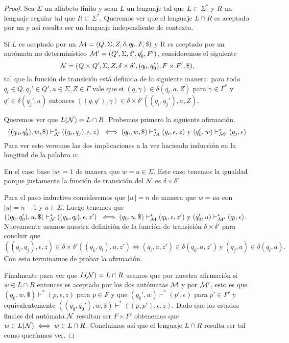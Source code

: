 \documentclass[tesis.tex]{subfiles}
\begin{document}
\begin{proof}
	Sea $\Sigma$ un alfabeto finito y sean $L$ un lenguaje \ic tal que $L \subset \Sigma^*$ y $R$ un lenguaje regular tal que $R \subset \Sigma^*$. 
	Queremos ver que el lenguaje $L \cap R$ es aceptado por un \APND y así resulta ser un lenguaje independiente de contexto.
	
	Si $L$ es aceptado por un \APND ${\cal M } = (Q, \Sigma, Z, \delta, q_0, F, \$)$ y R es aceptado por un autómata no determinístico ${\cal M' } = (Q', \Sigma, \delta', q_0', F')$, consideremos el siguiente \APND
	\[
		{\cal N } = (Q \times Q', \Sigma, Z, \delta \times \delta', (q_0,q_0'), F \times F', \$),
	\]	
	tal que la función de transición está definida de la siguiente manera:
	para todo $q_{i} \in Q, q_{j}' \in Q', a \in \Sigma, Z \in \Gamma$ vale que
	si $(q,\gamma) \in \delta(q_{i},a,Z)$ para $\gamma \in \Gamma^*$ y $q'  \in \delta(q_{j}', a)$ entonces $ ((q,q'), \gamma) \in \delta \times \delta'((q_{i},q_{j}'),a,Z)$.
	
	
	Queremos ver que $L({\cal N}) = L \cap R $.	
	Probemos primero la siguiente afirmación.
	\[
	((q_0,q_0'), w, \$) \vdash^*_{\cal N}  ((q_i,q_j), \epsilon, z) \ \iff (q_0, w, \$) \vdash^*_{\cal M}  (q_i, \epsilon, z) \ \text{y} \ (q_0', w) \vdash^*_{\cal M'} (q_j, \epsilon)  	
	\]
	Para ver esto veremos las dos implicaciones a la vez haciendo inducción en la longitud de la palabra $w$.
	
	En el caso base $|w| = 1$ de manera que $w = a \in \Sigma$.
	Este caso tenemos la igualdad porque justamente la función de transición del \APND $\cal N$ es $\delta \times \delta'$.
	
	Para el paso inductivo consideremos que $|w|=n$ de manera que $w=ua$ con $|u|=n-1$ y $a \in \Sigma$.
	Luego tenemos que $((q_0,q_0'), u, \$) \vdash^*_{\cal N}  ((q_k,q_l), \epsilon, z') \ \iff (q_0, u, \$) \vdash^*_{\cal M}  (q_k, \epsilon, z') \ \text{y} \ (q_0', u) \vdash^*_{\cal M'} (q_l, \epsilon)$.
	Nuevamente usamos nuestra definición de la función de transición $\delta \times \delta'$ para concluir que
	\[ 
	((q_i,q_j),\epsilon, z) \in \delta \times \delta'((q_k,q_l), a, z') \iff  (q_i, a, z') \in \delta(q_k, a, z') \ \text{y} \ (q_j, a) \in \delta(q_l, a).
	\]	
	Con esto terminamos de probar la afirmación.
	
	Finalmente para ver que $L({\cal N})  =  L \cap R$ usamos que por nuestra afirmación si $w \in L \cap R$ entonces es aceptado por los dos autómatas $\cal M$ y por $\cal M'$, esto es que $(q_0, w, \$) \vdash^* (p, \epsilon, z)$ para $p \in F$ y que $(q_0', w) \vdash^* (p', \epsilon)$ para $p' \in F'$ y equivalentemente $((q_0,q_0'),w,\$) \vdash^* ((p, p'),\epsilon, z)$. 
	Dado que los estados finales del autómata $\cal N$ resultan ser $F \times F'$ obtenemos que $w \in L({\cal N}) \iff w \in L \cap R$.
	Concluimos así que el lenguaje $L \cap R$ resulta ser \ic tal como queríamos ver.		
\end{proof}
\end{document}
